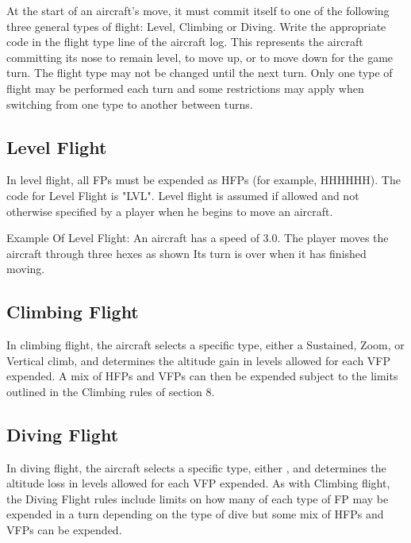 At the start of an aircraft's move, it must commit itself to one of the following three general types of flight: Level, Climbing or Diving. Write the appropriate code in the flight type line of the aircraft log. This represents the aircraft committing its nose to remain level, to move up, or to move down for the game turn. The flight type may not be changed until the next turn. Only one type of flight may be performed each turn and some restrictions may apply when switching from one type to another between turns.

\subsection{Level Flight}
In level flight, all FPs must be expended as HFPs (for example, HHHHHH). The code for Level Flight is "LVL". Level flight is assumed if allowed and not otherwise specified by a player when he begins to move an aircraft.

Example Of Level Flight: An aircraft has a speed of 3.0. The player moves the aircraft through three hexes as shown  Its turn is over when it has finished moving.


\subsection{Climbing Flight}
In climbing flight, the aircraft selects a specific type, either a Sustained, Zoom, or Vertical climb, and determines the altitude gain in levels allowed for each VFP expended. A mix of HFPs and VFPs can then be expended subject to the limits outlined in the Climbing rules of section 8.

\subsection{Diving Flight}
In diving flight, the aircraft selects a specific type, either , and determines the altitude loss in levels allowed for each VFP expended. As with Climbing flight, the Diving Flight rules include limits on how many of each type of FP may be expended in a turn depending on the type of dive but some mix of HFPs and VFPs can be expended.

